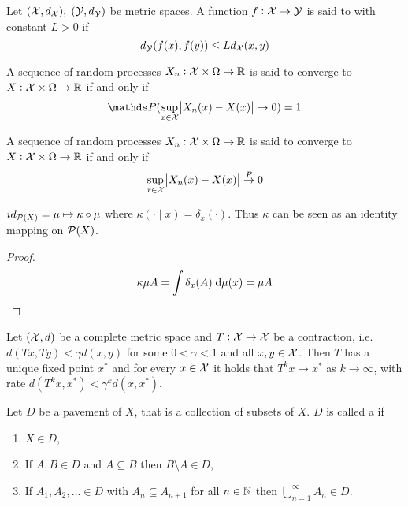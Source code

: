 \begin{defn}
  Let $(\mathcal{X}, d_\mathcal{X}), \; (\mathcal{Y}, d_\mathcal{Y})$ be metric spaces.
  A function $f: \mathcal{X} \to \mathcal{Y}$ is
  said to  with constant $L > 0$ if
  \[ d_\mathcal{Y}(f(x),f(y)) \leq L d_\mathcal{X}(x,y) \]
  \label{defn:Lipschitz}
\end{defn}

\begin{defn} 
  A sequence of random processes $X_n : \mathcal{X} \times \Omega \to \mathbb{R}$
  is said to converge  to $X: \mathcal{X} \times \Omega \to \mathbb{R}$ if and only if
  \[ \Prob(\sup_{x \in \Cal{X}} \abs{X_n(x) - X(x)} \to 0) = 1 \]
\end{defn}

\begin{defn} 
  A sequence of random processes $X_n: \mathcal{X} \times \Omega \to \mathbb{R}$
  is said to converge  to $X : \mathcal{X} \times \Omega \to \mathbb{R}$ if and only if
  \[ \sup_{x \in \mathcal{X}} \abs{X_n(x) - X(x)} \overset{P}{\to} 0 \]
\end{defn}

\begin{prop}
  $id_{\mathcal{P}(X)} = \mu \mapsto \kappa \circ \mu$
  where $\kappa(\cdot \mid x) = \delta_x(\cdot)$.
  Thus $\kappa$ can be seen as an identity mapping on $\mathcal{P}(X)$.
  \label{prop:identityKernel}
\end{prop}
\begin{proof}
  \[ \kappa \mu A = \int \delta_x(A) \; \mathrm{d} \mu(x) = \mu A \]
\end{proof}


\begin{thm}
  Let $(\mathcal{X}, d)$ be a complete metric space
  and $T:\mathcal{X} \to \mathcal{X}$ be a contraction,
  i.e. $d(Tx, Ty)<\gamma d(x, y)$ for some $0 < \gamma < 1$
  and all $x,y \in \mathcal{X}$.
  Then $T$ has a unique fixed point $x^*$ and for every $x\in \mathcal{X}$
  it holds that $T^k x \to x^*$ as $k \to \infty$, with rate
  $d(T^k x, x^*) < \gamma^k d(x, x^*)$.
\end{thm}

\begin{defn}
  Let $D$ be a pavement of $X$,
  that is a collection of subsets of $X$.
  $D$ is called a  if
  \begin{enumerate}
    \item $X \in D$,
    \item If $A, B \in D$ and $A \subseteq B$ then $B \setminus A \in D$,
    \item If $A_1, A_2, \dots \in D$ with $A_n \subseteq A_{n+1}$ for
      all $n \in \mathbb{N}$ then $\bigcup_{n=1}^\infty A_n \in D$.
  \end{enumerate}
  \label{defn:DynkinClass}
\end{defn}

